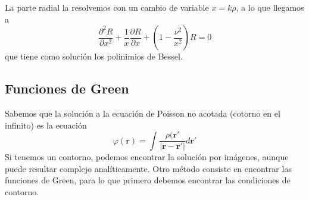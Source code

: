 \documentclass[a4paper]{article}
\numberwithin{equation}{section} %
\renewcommand{\vec}[1]{\boldsymbol{#1}}
\begin{document}
La parte radial la resolvemos con un cambio de variable $x = k \rho$, a lo que llegamos a
\begin{equation}
		\frac{\partial^2 R}{\partial x^2} + \frac{1}{x} \frac{\partial R}{\partial x} + \left(1 - \frac{\nu^2}{x^2} \right) R = 0
\end{equation}
que tiene como solución los polinimios de Bessel.

\subsection{Funciones de Green}
Sabemos que la solución a la ecuación de Poisson no acotada (cotorno en el infinito) es la ecuación
\begin{equation}
	\varphi(\vec{r}) = \int \frac{\rho(\vec{r}'}{|\vec{r} - \vec{r}'|} d\vec{r}'
\end{equation}
Si tenemos un contorno, podemos encontrar la solución por imágenes, aunque puede resultar complejo analíticamente. Otro método consiste en encontrar las funciones de Green, para lo que primero debemos encontrar las condiciones de contorno.
\end{document}
